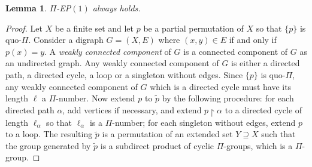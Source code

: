 \documentclass[10pt,a4paper]{amsart}
\newtheorem{lemma}[theorem]{Lemma}
\theoremstyle{definition}
\theoremstyle{definition}
\numberwithin{equation}{section}
\begin{document}
\begin{lemma} $\Pi$-{\rm EP}$(1)$ always holds.
\end{lemma}

\begin{proof} Let $X$ be a finite set and let $p$ be a partial permutation of $X$ so that $\{p\}$ is quo-$\Pi$. Consider a digraph $G=(X, E)$ where $(x,y)\in E$ if and only if $p(x)=y$. A {\em weakly connected component} of $G$ is a connected component of $G$ as an undirected graph. Any weakly connected component of $G$ is either a directed path, a directed cycle, a loop or a singleton without edges. Since $\{p\}$ is quo-$\Pi$, any weakly connected component of $G$ which is a directed cycle must have its length $\ell$ a $\Pi$-number. Now extend $p$ to $\tilde{p}$ by the following procedure: for each directed path $\alpha$, add vertices if necessary, and extend $p\upharpoonright \alpha$ to a directed cycle of length $\ell_\alpha$ so that $\ell_\alpha$ is a $\Pi$-number; for each singleton without edges, extend $p$ to a loop. The resulting $\tilde{p}$ is a permutation of an extended set $Y\supseteq X$ such that the group generated by $\tilde{p}$ is a subdirect product of cyclic $\Pi$-groups, which is a $\Pi$-group. 
\end{proof}
\end{document}
